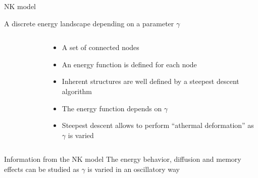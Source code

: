 \documentclass[compress]{beamer}
\begin{document}
	\begin{frame}{NK model}

		\begin{block}{A discrete energy landscape depending on a parameter $\gamma$}
		
			\footnotesize
			
			\begin{columns}[c]
				\begin{column}{0.35\textwidth}
					\centering
					\begin{figure}
					\end{figure}
				\end{column}
				\begin{column}{0.65\textwidth}
					\begin{itemize}
						\item<1-> A set of connected nodes
						\item<2-> An energy function is defined for each node
						\item<3-> Inherent structures are well defined by a steepest descent algorithm
						\item<4-> The energy function depends on $\gamma$ 
						\item<8-> Steepest descent allows to perform ``athermal deformation'' as $\gamma$ is varied
					\end{itemize}
				\end{column}
			\end{columns}
		\end{block}
		\begin{block}{Information from the NK model}
			The energy behavior, diffusion and memory effects can be studied as $\gamma$ is varied in an oscillatory way
		\end{block}
		
	\end{frame}
\end{document}
